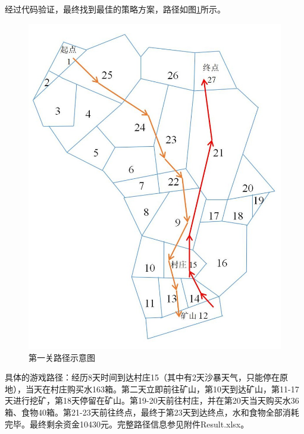 \documentclass[withoutpreface,bwprint]{cumcmthesis} %
\begin{document}
经过代码验证，最终找到最佳的策略方案，路径如图\ref{fig:map1word}所示。
\begin{figure}[H]
	\centering
	\includegraphics[scale=0.5]{figures/map1word.jpg}
	\caption{第一关路径示意图}
	\label{fig:map1word}
\end{figure}

具体的游戏路径：经历8天时间到达村庄15（其中有2天沙暴天气，只能停在原地），当天在村庄购买水163箱。第二天立即前往矿山，第10天到达矿山，第11-17天进行挖矿，第18天停留在矿山。第19-20天前往村庄，并在第20天当天购买水36箱、食物40箱。第21-23天前往终点，最终于第23天到达终点，水和食物全部消耗完毕。最终剩余资金10430元。完整路径信息参见附件Result.xlsx。
\end{document}
